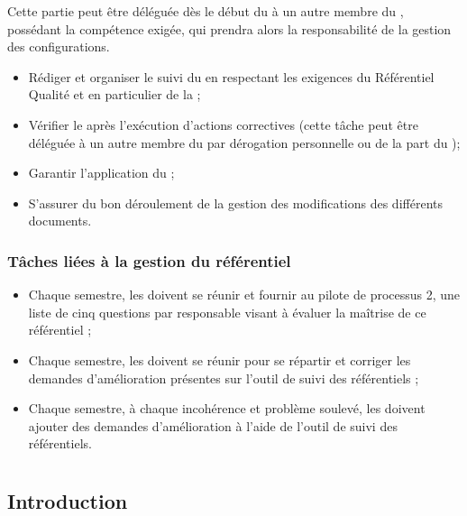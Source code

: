 Cette partie peut être déléguée dès le début du \PICCourt{} à un autre membre du \PICCourt{}, possédant la compétence exigée, qui prendra alors la responsabilité de la gestion des configurations.

\begin{itemize}
	\item Rédiger et organiser le suivi du \PGCCourt{} en respectant les exigences du Référentiel Qualité et en particulier de la \DGQDEUXCourt;


	\item Vérifier le \PGCCourt{} après l’exécution d’actions correctives (cette tâche peut être déléguée à un autre membre du \PICCourt{} par dérogation personnelle ou de la part du \CP);

	\item Garantir l’application du \PGCCourt;
	\item S’assurer du bon déroulement de la gestion des modifications des différents documents.
\end{itemize}

\subsubsection*{Tâches liées à la gestion du référentiel}

\begin{itemize}

	\item Chaque semestre, les \RQs{} doivent se réunir et fournir au pilote de processus 2, une liste de cinq questions par responsable visant à évaluer la maîtrise de ce référentiel ;

	\item Chaque semestre, les \RQs{} doivent se réunir pour se répartir et corriger les demandes d’amélioration présentes sur l’outil de suivi des référentiels ;
	\item Chaque semestre, à chaque incohérence et problème soulevé, les \RQs{} doivent ajouter des demandes d’amélioration à l’aide de l’outil de suivi des référentiels.
\end{itemize}

\newpage
\section{\RQA}
\subsection*{Introduction}

